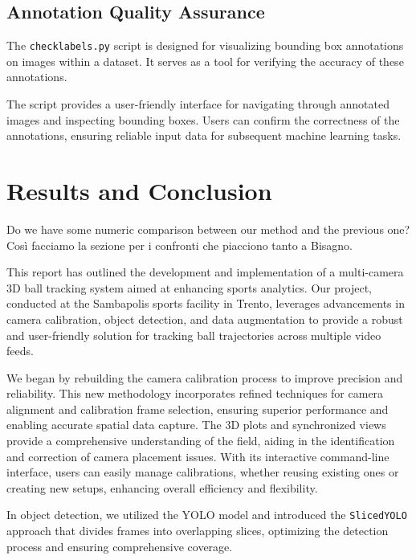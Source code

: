 \documentclass{template}
\begin{document}
\section{Annotation Quality Assurance}

The \texttt{checklabels.py} script is designed for visualizing bounding box annotations on images within a dataset. 
It serves as a tool for verifying the accuracy of these annotations.

The script provides a user-friendly interface for navigating through annotated images and inspecting bounding boxes.
Users can confirm the correctness of the annotations, ensuring reliable input data for subsequent machine learning tasks.

\chapter{Results and Conclusion}

Do we have some numeric comparison between our method and the previous one? Così facciamo la sezione per i confronti che piacciono tanto a Bisagno.
\cite{gulawani2006cfd}

This report has outlined the development and implementation of a multi-camera 3D ball tracking system aimed at enhancing sports analytics. 
Our project, conducted at the Sambapolis sports facility in Trento, leverages advancements in camera calibration, object detection, and data augmentation to provide a robust and user-friendly solution for tracking ball trajectories across multiple video feeds.

We began by rebuilding the camera calibration process to improve precision and reliability. 
This new methodology incorporates refined techniques for camera alignment and calibration frame selection, ensuring superior performance and enabling accurate spatial data capture. 
The 3D plots and synchronized views provide a comprehensive understanding of the field, aiding in the identification and correction of camera placement issues. 
With its interactive command-line interface, users can easily manage calibrations, whether reusing existing ones or creating new setups, enhancing overall efficiency and flexibility.

In object detection, we utilized the YOLO model and introduced the \texttt{SlicedYOLO} approach that divides frames into overlapping slices, optimizing the detection process and ensuring comprehensive coverage. 
\end{document}
